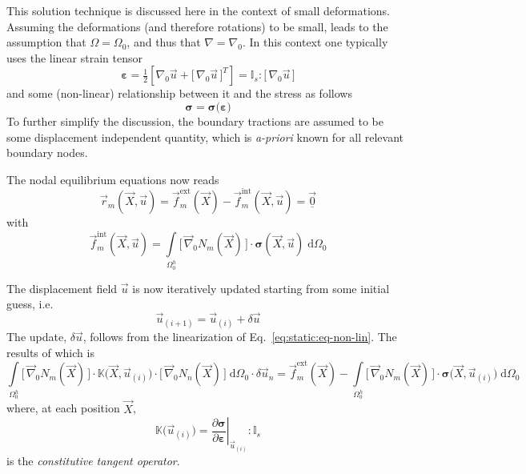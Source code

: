 \documentclass[times,namecite]{goose-article}
\begin{document}
This solution technique is discussed here in the context of small deformations. Assuming the deformations (and therefore rotations) to be small, leads to the assumption that $\Omega = \Omega_0$, and thus that $\nabla = \nabla_0$. In this context one typically uses the linear strain tensor
\begin{equation}
  \bm{\varepsilon}
  =
  \tfrac{1}{2} \left[ \nabla_0 \vec{u} + \big[\, \nabla_0 \vec{u} \,\big]^T \right]
  =
  \mathbb{I}_s : \big[\, \nabla_0 \vec{u} \,\big]
\end{equation}
and some (non-linear) relationship between it and the stress as follows
\begin{equation}
  \bm{\sigma} = \bm{\sigma} \big( \bm{\varepsilon} \big)
\end{equation}
To further simplify the discussion, the boundary tractions are assumed to be some displacement independent quantity, which is \textit{a-priori} known for all relevant boundary nodes.

The nodal equilibrium equations now reads
\begin{equation}
\label{eq:static:eq-non-lin}
  \vec{r}_m(\vec{X}, \vec{u})
  =
  \vec{f}_m^\mathrm{ext}(\vec{X})
  -
  \vec{f}_m^\mathrm{int}(\vec{X}, \vec{u})
  =
  \underline{\vec{0}}
\end{equation}
with
\begin{equation}
  \vec{f}_m^\mathrm{int}(\vec{X}, \vec{u})
  =
  \int\limits_{\Omega^h_0}
    \big[\, \vec{\nabla}_0 N_m(\vec{X}) \,\big]
    \cdot
    \bm{\sigma}(\vec{X}, \vec{u}) \;
  \mathrm{d}\Omega_0
\end{equation}

The displacement field $\vec{u}$ is now iteratively updated starting from some initial guess, i.e.
\begin{equation}
  \vec{u}_{(i+1)} = \vec{u}_{(i)} + \delta \vec{u}
\end{equation}
The update, $\delta \vec{u}$, follows from the linearization of Eq.~\eqref{eq:static:eq-non-lin}. The results of which is
\begin{equation}
  \int\limits_{\Omega^h_0}
    \big[\, \vec{\nabla}_0 N_m(\vec{X}) \,\big]
    \cdot
    \mathbb{K}\big(\vec{X},\vec{u}_{(i)}\big)
    \cdot
    \big[\, \vec{\nabla}_0 N_n(\vec{X}) \,\big] \;
  \mathrm{d}\Omega_0
  \cdot \delta \vec{u}_n
  =
  \vec{f}_m^\mathrm{ext}(\vec{X})
  -
  \int\limits_{\Omega^h_0}
    \big[\, \vec{\nabla}_0 N_m(\vec{X}) \,\big]
    \cdot
    \bm{\sigma}\big(\vec{X},\vec{u}_{(i)}\big) \;
  \mathrm{d}\Omega_0
\end{equation}
where, at each position $\vec{X}$,
\begin{equation}
  \mathbb{K}\big(\vec{u}_{(i)}\big)
  =
  \left. \frac{\partial \bm{\sigma}}{\partial \bm{\varepsilon}} \right|_{\vec{u}_{(i)}}
  :
  \mathbb{I}_s
\end{equation}
is the \emph{constitutive tangent operator}.
\end{document}
